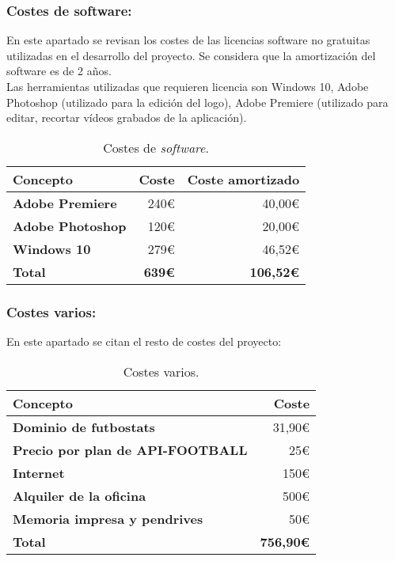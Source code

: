 \subsubsection{Costes de software:}
En este apartado se revisan los costes de las licencias software no gratuitas utilizadas en el desarrollo del proyecto. Se considera que la amortización del software es de 2 años. \\
Las herramientas utilizadas que requieren licencia son Windows 10, Adobe Photoshop (utilizado para la edición del logo), Adobe Premiere (utilizado para editar, recortar vídeos grabados de la aplicación).
\begin{table}[h!]
    \centering
    \begin{tabular}{>{\bfseries}l r r}
        \toprule
        \textbf{Concepto} & \textbf{Coste} & \textbf{Coste amortizado} \\
        \midrule
        Adobe Premiere & 240€ & 40,00€ \\
        Adobe Photoshop & 120€ & 20,00€ \\
        Windows 10 & 279€ & 46,52€ \\
        \midrule
        \textbf{Total} & \textbf{639€} & \textbf{106,52€} \\
        \bottomrule
    \end{tabular}
    \caption{Costes de \textit{software}.}
    \label{tabla:costes_software}
\end{table}
\subsubsection{Costes varios:}
En este apartado se citan el resto de costes del proyecto:
\begin{table}[h!]
    \centering
    \begin{tabular}{>{\bfseries}l r}
        \toprule
        \textbf{Concepto} & \textbf{Coste} \\
        \midrule
        Dominio de futbostats & 31,90€ \\
        Precio por plan de API-FOOTBALL & 25€ \\
        Internet & 150€ \\
        Alquiler de la oficina & 500€ \\
        Memoria impresa y pendrives & 50€ \\
        \midrule
        \textbf{Total} & \textbf{756,90€} \\
        \bottomrule
    \end{tabular}
    \caption{Costes varios.}
    \label{tabla:costes_varios}
\end{table}
